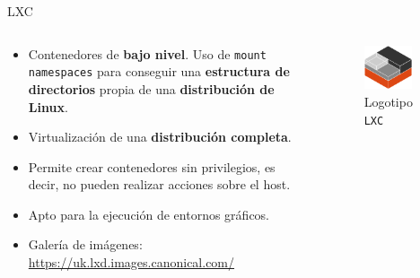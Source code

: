 \documentclass[aspectratio=169,xcolor=dvipsnames]{beamer}
\begin{document}
	\begin{frame}{LXC}
	    \begin{columns}
	        \begin{column}{0.6\textwidth}
	            \begin{itemize}
	                \item Contenedores de \textbf{bajo nivel}. Uso de \texttt{mount namespaces} para conseguir una \textbf{estructura de directorios} propia de una \textbf{distribución de Linux}.
	                \item Virtualización de una \textbf{distribución completa}.
	                \item Permite crear contenedores sin privilegios, es decir, no pueden realizar acciones sobre el host.
	                \item Apto para la ejecución de entornos gráficos.
	                \item Galería de imágenes: \url{https://uk.lxd.images.canonical.com/}
	            \end{itemize}
	        \end{column}
	        
	        \begin{column}{0.4\textwidth}
	            \begin{figure}[h]
                \includegraphics[width=0.8\textwidth]{img/lxc_logo.png}
                \caption{Logotipo \texttt{LXC}}
                \end{figure}
	        \end{column}
	    \end{columns}
	\end{frame}
	
\end{document}
